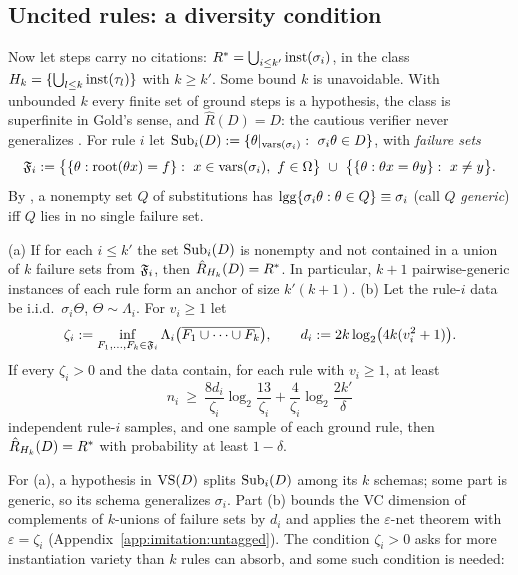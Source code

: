 \subsection{Uncited rules: a diversity condition}\label{sec:imitation:untagged}

Now let steps carry no citations: $R^{*}=\bigcup_{i\le k'}\mathrm{inst}(\sigma_i)$, in the class $H_k=\{\bigcup_{l\le k}\mathrm{inst}(\tau_l)\}$ with $k\ge k'$. Some bound $k$ is unavoidable. With unbounded $k$ every finite set of ground steps is a hypothesis, the class is superfinite in Gold's sense, and $\hat R(D)=D$: the cautious verifier never generalizes \citep{gold1967language}. For rule $i$ let $\Sub_i(D):=\{\theta|_{\vars(\sigma_i)}:\ \sigma_i\theta\in D\}$, with \emph{failure sets}
\[
\Fail_i:=\bigl\{\{\theta:\rt(\theta x)=f\}:\ x\in\vars(\sigma_i),\ f\in\Omega\bigr\}\ \cup\ \bigl\{\{\theta:\theta x=\theta y\}:\ x\neq y\bigr\}.
\]
By , a nonempty set $Q$ of substitutions has $\mathrm{lgg}\{\sigma_i\theta:\theta\in Q\}\equiv\sigma_i$ (call $Q$ \emph{generic}) iff $Q$ lies in no single failure set.

\begin{theorem}\label{thm:imitation:untagged}
\textup{(a)} If for each $i\le k'$ the set $\mathrm{Sub}_i(D)$ is nonempty and not contained in a union of $k$ failure sets from $\mathfrak F_i$, then $\hat R_{H_k}(D)=R^{*}$. In particular, $k+1$ pairwise-generic instances of each rule form an anchor of size $k'(k+1)$.
\textup{(b)} Let the rule-$i$ data be i.i.d.\ $\sigma_i\Theta$, $\Theta\sim\Lambda_i$. For $v_i\ge1$ let
\[
\zeta_i:=\inf_{F_1,\dots,F_k\in\mathfrak F_i}\Lambda_i\bigl(\overline{F_1\cup\dots\cup F_k}\bigr),\qquad d_i:=2k\log_2\bigl(4k(v_i^2+1)\bigr).
\]
If every $\zeta_i>0$ and the data contain, for each rule with $v_i\ge1$, at least
\[
n_i\ \ge\ \frac{8d_i}{\zeta_i}\log_2\frac{13}{\zeta_i}+\frac4{\zeta_i}\log_2\frac{2k'}{\delta}
\]
independent rule-$i$ samples, and one sample of each ground rule, then $\hat R_{H_k}(D)=R^{*}$ with probability at least $1-\delta$.
\end{theorem}

For (a), a hypothesis in $\mathrm{VS}(D)$ splits $\mathrm{Sub}_i(D)$ among its $k$ schemas; some part is generic, so its schema generalizes $\sigma_i$. Part (b) bounds the VC dimension of complements of $k$-unions of failure sets by $d_i$ and applies the $\varepsilon$-net theorem \citep{haussler1987epsilon,blumer1989learnability} with $\varepsilon=\zeta_i$ (Appendix~\ref{app:imitation:untagged}). The condition $\zeta_i>0$ asks for more instantiation variety than $k$ rules can absorb, and some such condition is needed:

